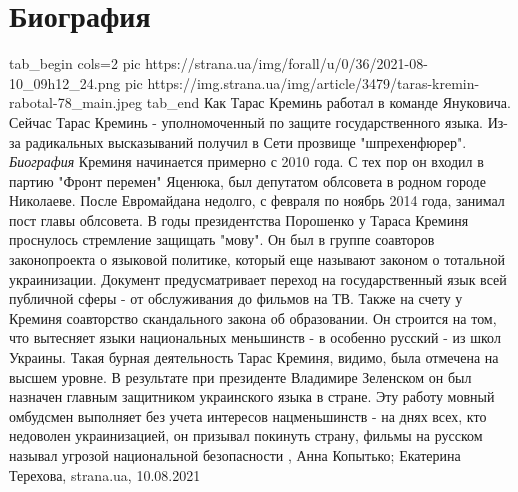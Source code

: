  
 
 
 
 
\chapter{Биография}
\label{sec:slova.biografia}

\ifcmt
  tab_begin cols=2
     pic https://strana.ua/img/forall/u/0/36/2021-08-10_09h12_24.png
     pic https://img.strana.ua/img/article/3479/taras-kremin-rabotal-78_main.jpeg
  tab_end
\fi
Как Тарас Креминь работал в команде Януковича.  Сейчас Тарас Креминь -
уполномоченный по защите государственного языка. Из-за радикальных высказываний
получил в Сети прозвище "шпрехенфюрер".  \emph{Биография} Креминя начинается
примерно с 2010 года. С тех пор он входил в партию "Фронт перемен" Яценюка, был
депутатом облсовета в родном городе Николаеве.  После Евромайдана недолго, с
февраля по ноябрь 2014 года, занимал пост главы облсовета.  В годы
президентства Порошенко у Тараса Креминя проснулось стремление защищать "мову".
Он был в группе соавторов законопроекта о языковой политике, который еще
называют законом о тотальной украинизации. Документ предусматривает переход на
государственный язык всей публичной сферы - от обслуживания до фильмов на ТВ.
Также на счету у Креминя соавторство скандального закона об образовании. Он
строится на том, что вытесняет языки национальных меньшинств - в особенно
русский - из школ Украины.  Такая бурная деятельность Тарас Креминя, видимо,
была отмечена на высшем уровне. В результате при президенте Владимире Зеленском
он был назначен главным защитником украинского языка в стране. Эту работу
мовный омбудсмен выполняет без учета интересов нацменьшинств - на днях всех,
кто недоволен украинизацией, он призывал покинуть страну, фильмы на русском
называл угрозой национальной безопасности
, 
Анна Копытько; Екатерина Терехова, strana.ua, 10.08.2021
